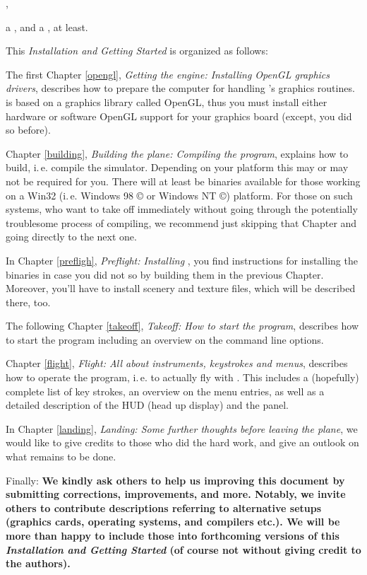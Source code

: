 ,

 \noindent
a \textit{}, and a
\textit{}, at least.

This \textit{Installation and Getting Started} is organized as
follows:

The first Chapter \ref{opengl}, \textit{Getting the engine: Installing OpenGL graphics
drivers}, describes how to prepare the computer for handling \FlightGear's graphics
routines. \FlightGear is based on a graphics library called OpenGL, thus you must install
either hardware or software OpenGL support for your graphics board (except, you did so
before).

Chapter \ref{building}, \textit{Building the plane: Compiling the program}, explains how
to build, i.\,e. compile the simulator. Depending on your platform this may or may not be
required for you. There will at least be binaries available for those working on a Win32
(i.\,e. Windows 98 {\copyright} or Windows NT {\copyright}) platform. For those on such
systems, who want to take off immediately without going through the potentially
troublesome process of compiling, we recommend just skipping that Chapter and going
directly to the next one.

In Chapter \ref{prefligh}, \textit{Preflight: Installing \FlightGear}, you find
instructions for installing the binaries in case you did not so by building them in the
previous Chapter. Moreover, you'll have to install scenery and texture files, which will
be described there, too.

The following Chapter \ref{takeoff}, \textit{Takeoff: How to start the program},
describes how to start the program including an overview on the command line options.

Chapter \ref{flight}, \textit{Flight: All about instruments, keystrokes and menus},
describes how to operate the program, i.\,e. to actually fly with
\FlightGear\hspace{-1mm}. This includes a (hopefully) complete list of key strokes, an
overview on the menu entries, as well as a detailed description of the HUD (head up
display) and the panel.

In Chapter \ref{landing}, \textit{Landing: Some further thoughts before leaving the
plane}, we would like to give credits to those who did the hard work, and give an outlook
on what remains to be done.

Finally: \textbf{We kindly ask others to help us improving this document by submitting
corrections, improvements, and more. Notably, we invite others to contribute descriptions
referring to alternative setups (graphics cards, operating systems, and compilers etc.).
We will be more than happy to include those into forthcoming versions of this
\textit{Installation and Getting Started} (of course not without giving credit to the
authors).}

